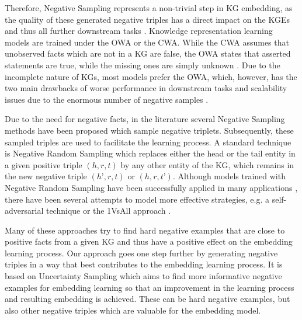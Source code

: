 Therefore, Negative Sampling represents a non-trivial step in \ac{KG} embedding, as the quality of these generated negative triples has a direct impact on the \acp{KGE} and thus all further downstream tasks \cite{qiannegative}.
Knowledge representation learning models are trained under the \ac{OWA} or the \ac{CWA}.
While the \ac{CWA} assumes that unobserved facts which are not in a \ac{KG} are false, the \ac{OWA}  states that asserted statements are true, while the missing ones are simply unknown \cite{arnaout2020enriching, qiannegative}.
Due to the incomplete nature of KGs, most models prefer the \ac{OWA}, which, however, has the two main drawbacks of 
worse performance in downstream tasks and scalability issues due to the enormous number of negative samples \cite{qiannegative}.

Due to the need for negative facts, in the literature several Negative Sampling methods have been proposed which sample negative triplets.
Subsequently, these sampled triples are used to facilitate the learning process. 
A standard technique is Negative Random Sampling which replaces either the head or the tail entity in a given positive triple $(h, r, t)$ by any other entity of the \ac{KG}, which remains in the new negative triple $(h’,r,t)$ or $(h,r,t’)$. 
Although models trained with Negative Random Sampling have been successfully applied in many applications \cite{TransE}, there have been several attempts to model more effective strategies, e.g. 
a self-adversarial technique \cite{RotatE} or the 1VsAll approach \cite{ConvE}.

Many of these approaches try to find hard negative examples that are close to positive facts from a given \ac{KG} and thus have a positive effect on the embedding learning process.
Our approach goes one step further by generating negative triples in a way that best contributes to the embedding learning process. 
It is based on Uncertainty Sampling which aims to
find more informative negative examples for embedding learning so that an improvement in the learning process and resulting embedding is achieved.
These can be hard negative examples, but also other negative triples which are valuable for the embedding model.